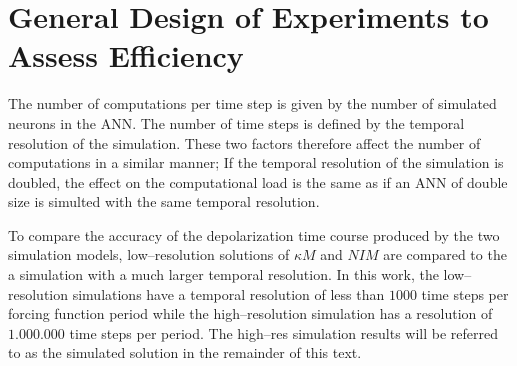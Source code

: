 
\section{General Design of Experiments to Assess Efficiency}

	The number of computations per time step is given by the number of simulated neurons in the ANN.
	The number of time steps is defined by the temporal resolution of the simulation.
	These two factors therefore affect the number of computations in a similar manner; 
		If the temporal resolution of the simulation is doubled, the effect on the computational load is the same as if an ANN of double size is simulted with the same temporal resolution.


	To compare the accuracy of the depolarization time course produced by the two simulation models, low--resolution solutions of $\kappa M$ and $NIM$ are compared to the a simulation with a much larger temporal resolution.
	In this work, the low--resolution simulations have a temporal resolution of less than $1000$ time steps per forcing function period while the high--resolution simulation has a resolution of $1.000.000$ time steps per period.
	The high--res simulation results will be referred to as the simulated solution in the remainder of this text.

